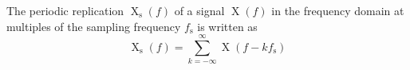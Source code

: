 The periodic replication $\operatorname{X}_{\mathrm{s}}(f)$ of a signal $\operatorname{X}(f)$ in the frequency domain at multiples of the sampling frequency $f_{\mathrm{s}}$ is written as
$$\operatorname{X}_{\mathrm{s}}(f) = \sum\limits_{k = -\infty}^{\infty} \operatorname{X}(f - k f_{\mathrm{s}})$$
